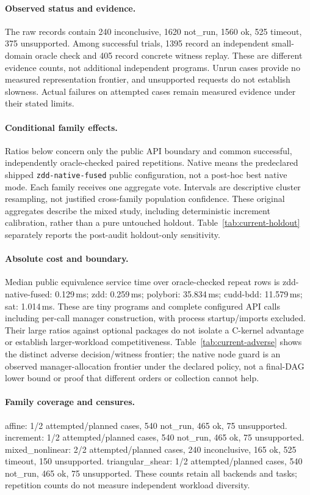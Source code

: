 \paragraph{Observed status and evidence.} The raw records contain 240 inconclusive, 1620 not\_run, 1560 ok, 525 timeout, 375 unsupported. Among successful trials, 1395 record an independent small-domain oracle check and 405 record concrete witness replay. These are different evidence counts, not additional independent programs. Unrun cases provide no measured representation frontier, and unsupported requests do not establish slowness. Actual failures on attempted cases remain measured evidence under their stated limits.

\paragraph{Conditional family effects.} Ratios below concern only the public API boundary and common successful, independently oracle-checked paired repetitions. Native means the predeclared shipped \texttt{zdd-native-fused} public configuration, not a post-hoc best native mode. Each family receives one aggregate vote. Intervals are descriptive cluster resampling, not justified cross-family population confidence. These original aggregates describe the mixed study, including deterministic increment calibration, rather than a pure untouched holdout. Table~\ref{tab:current-holdout} separately reports the post-audit holdout-only sensitivity.

\paragraph{Absolute cost and boundary.} Median public equivalence service time over oracle-checked repeat rows is zdd-native-fused: 0.129\,ms; zdd: 0.259\,ms; polybori: 35.834\,ms; cudd-bdd: 11.579\,ms; sat: 1.014\,ms. These are tiny programs and complete configured API calls including per-call manager construction, with process startup/imports excluded. Their large ratios against optional packages do not isolate a C-kernel advantage or establish larger-workload competitiveness. Table~\ref{tab:current-adverse} shows the distinct adverse decision/witness frontier; the native node guard is an observed manager-allocation frontier under the declared policy, not a final-DAG lower bound or proof that different orders or collection cannot help.

\paragraph{Family coverage and censures.} affine: 1/2 attempted/planned cases, 540 not\_run, 465 ok, 75 unsupported. increment: 1/2 attempted/planned cases, 540 not\_run, 465 ok, 75 unsupported. mixed\_nonlinear: 2/2 attempted/planned cases, 240 inconclusive, 165 ok, 525 timeout, 150 unsupported. triangular\_shear: 1/2 attempted/planned cases, 540 not\_run, 465 ok, 75 unsupported. These counts retain all backends and tasks; repetition counts do not measure independent workload diversity.

